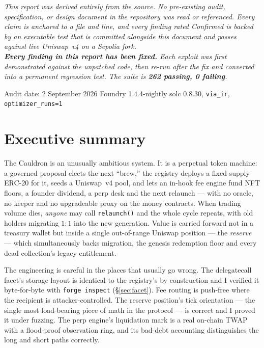 \documentclass[10pt,a4paper]{article}
\newcommand{\code}[1]{\texttt{\small #1}}
\begin{document}
\begin{titlepage}
\vspace{1.8cm}
\begin{minipage}{0.86\textwidth}
\small\itshape
This report was derived entirely from the source. No pre-existing audit,
specification, or design document in the repository was read or referenced.
Every claim is anchored to a file and line, and every finding rated
\emph{Confirmed} is backed by an executable test that is committed alongside
this document and passes against live Uniswap~v4 on a Sepolia fork.
\smallskip\\
\textbf{Every finding in this report has been fixed.} Each exploit was first
demonstrated against the unpatched code, then re-run after the fix and converted
into a permanent regression test. The suite is \textbf{262 passing, 0 failing}.
\end{minipage}

\vfill
{\small Audit date: 2 September 2026 \quad\textbullet\quad Foundry 1.4.4-nightly \quad\textbullet\quad solc 0.8.30, \texttt{via\_ir}, \texttt{optimizer\_runs=1}}
\end{titlepage}

\tableofcontents
\newpage

\section{Executive summary}

The Cauldron is an unusually ambitious system. It is a perpetual token machine:
a governed proposal elects the next ``brew,'' the registry deploys a fixed-supply
ERC-20 for it, seeds a Uniswap~v4 pool, and lets an in-hook fee engine fund
NFT floors, a founder dividend, a perp desk and the next relaunch --- with no
oracle, no keeper and no upgradeable proxy on the money contracts. When trading
volume dies, \emph{anyone} may call \code{relaunch()} and the whole cycle
repeats, with old holders migrating $1{:}1$ into the new generation. Value is
carried forward not in a treasury wallet but inside a single out-of-range
Uniswap position --- the \emph{reserve} --- which simultaneously backs migration,
the genesis redemption floor and every dead collection's legacy entitlement.

The engineering is careful in the places that usually go wrong. The
delegatecall facet's storage layout is identical to the registry's by
construction and I verified it byte-for-byte with \code{forge inspect}
(\S\ref{sec:facet}). Fee routing is push-free where the recipient is
attacker-controlled. The reserve position's tick orientation --- the single
most load-bearing piece of math in the protocol --- is correct and I proved it
under fuzzing. The perp engine's liquidation mark is a real on-chain TWAP with
a flood-proof observation ring, and its bad-debt accounting distinguishes the
long and short paths correctly.
\end{document}
